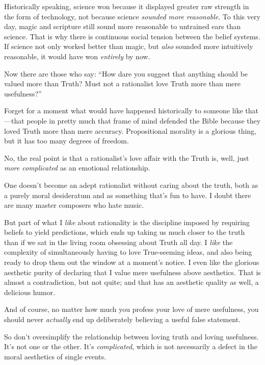 {
 Historically speaking, science won because it displayed greater
raw strength in the form of technology, not because science
\textit{sounded more reasonable}. To this very day, magic and scripture
still sound more reasonable to untrained ears than science. That is why
there is continuous social tension between the belief systems. If
science not only worked better than magic, but \textit{also} sounded
more intuitively reasonable, it would have won \textit{entirely} by
now.}

{
 Now there are those who say: ``How dare you
suggest that anything should be valued more than Truth? Must not a
rationalist love Truth more than mere usefulness?''}

{
 Forget for a moment what would have happened historically to
someone like that---that people in pretty much that frame of mind
defended the Bible because they loved Truth more than mere accuracy.
Propositional morality is a glorious thing, but it has too many degrees
of freedom.}

{
 No, the real point is that a rationalist's love
affair with the Truth is, well, just \textit{more complicated} as an
emotional relationship.}

{
 One doesn't become an adept rationalist without
caring about the truth, both as a purely moral desideratum and as
something that's fun to have. I doubt there are many
master composers who hate music.}

{
 But part of what I \textit{like} about rationality is the
discipline imposed by requiring beliefs to yield predictions, which
ends up taking us much closer to the truth than if we sat in the living
room obsessing about Truth all day. I \textit{like} the complexity of
simultaneously having to love True-seeming ideas, and also being ready
to drop them out the window at a moment's notice. I
even like the glorious aesthetic purity of declaring that I value mere
usefulness above aesthetics. That is almost a contradiction, but not
quite; and that has an aesthetic quality as well, a delicious humor.}

{
 And of course, no matter how much you profess your love of mere
usefulness, you should never \textit{actually} end up deliberately
believing a useful false statement.}

{
 So don't oversimplify the relationship between
loving truth and loving usefulness. It's not one or the
other. It's \textit{complicated}, which is not
necessarily a defect in the moral aesthetics of single events.}


